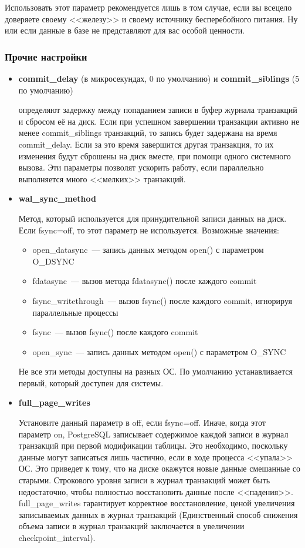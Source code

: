Использовать этот параметр рекомендуется лишь в том случае, если вы всецело доверяете своему <<железу>> и своему источнику 
бесперебойного питания. Ну или если данные в базе не представляют для вас особой ценности.

\subsubsection{Прочие настройки}
\begin{itemize}
\item 
\textbf{commit\_delay} (в микросекундах, 0 по умолчанию) и \textbf{commit\_sib\-lings} (5 по умолчанию) 

определяют задержку между попаданием записи в буфер журнала транзакций и сбросом её на диск. 
Если при успешном завершении транзакции активно не менее commit\_siblings транзакций, то запись будет задержана на время 
commit\_delay. Если за это время завершится другая транзакция, то их изменения будут сброшены на диск вместе, при помощи 
одного системного вызова. Эти параметры позволят ускорить работу, если параллельно выполняется много <<мелких>> транзакций.

\item \textbf{wal\_sync\_method}

Метод, который используется для принудительной записи данных на диск.
Если fsync=off, то этот параметр не используется.
Возможные значения:
\begin{itemize}
\item open\_datasync~--- запись данных методом open() с параметром O\_DSYNC
\item fdatasync~--- вызов метода fdatasync() после каждого commit
\item fsync\_writethrough~--- вызов fsync() после каждого commit, игнорируя параллельные процессы
\item fsync~--- вызов fsync() после каждого commit
\item open\_sync~--- запись данных методом open() с параметром O\_SYNC
\end{itemize}

Не все эти методы доступны на разных ОС. По умолчанию устанавливается первый, который доступен для системы.

\item \textbf{full\_page\_writes}

Установите данный параметр в off, если fsync=off. Иначе, когда этот параметр on, PostgreSQL записывает содержимое 
каждой записи в журнал транзакций при первой модификации таблицы. Это необходимо, поскольку 
данные могут записаться лишь частично, если в ходе процесса <<упала>> ОС. Это приведет к тому, что на диске окажутся 
новые данные смешанные со старыми. Строкового уровня записи в журнал транзакций может быть недостаточно, чтобы полностью 
восстановить данные после <<падения>>. full\_page\_writes гарантирует корректное восстановление, ценой увеличения записываемых 
данных в журнал транзакций (Единственный способ снижения объема записи в журнал транзакций заключается в 
увеличении checkpoint\_interval).


\end{itemize}

